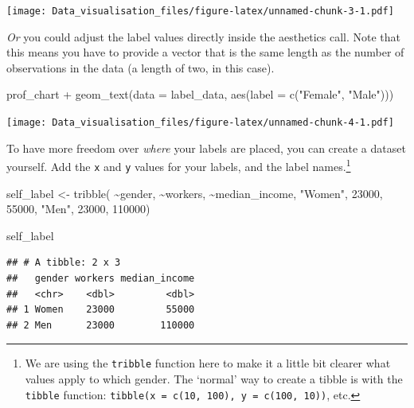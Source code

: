 \documentclass[
]{book}
\newenvironment{Shaded}{\begin{snugshade}}{\end{snugshade}}
\newcommand{\AttributeTok}[1]{\textcolor[rgb]{0.77,0.63,0.00}{#1}}
\newcommand{\DecValTok}[1]{\textcolor[rgb]{0.00,0.00,0.81}{#1}}
\newcommand{\FunctionTok}[1]{\textcolor[rgb]{0.00,0.00,0.00}{#1}}
\newcommand{\NormalTok}[1]{#1}
\newcommand{\OtherTok}[1]{\textcolor[rgb]{0.56,0.35,0.01}{#1}}
\newcommand{\SpecialCharTok}[1]{\textcolor[rgb]{0.00,0.00,0.00}{#1}}
\newcommand{\StringTok}[1]{\textcolor[rgb]{0.31,0.60,0.02}{#1}}
\begin{document}
\texttt{[image: Data\_visualisation\_files/figure-latex/unnamed-chunk-3-1.pdf]}

\emph{Or} you could adjust the label values directly inside the aesthetics call. Note that this means you have to provide a vector that is the same length as the number of observations in the data (a length of two, in this case).

\begin{Shaded}
\begin{Highlighting}[]
\NormalTok{prof\_chart }\SpecialCharTok{+}
  \FunctionTok{geom\_text}\NormalTok{(}\AttributeTok{data =}\NormalTok{ label\_data,}
            \FunctionTok{aes}\NormalTok{(}\AttributeTok{label =} \FunctionTok{c}\NormalTok{(}\StringTok{"Female"}\NormalTok{, }\StringTok{"Male"}\NormalTok{)))}
\end{Highlighting}
\end{Shaded}

\texttt{[image: Data\_visualisation\_files/figure-latex/unnamed-chunk-4-1.pdf]}

To have more freedom over \emph{where} your labels are placed, you can create a dataset yourself. Add the \texttt{x} and \texttt{y} values for your labels, and the label names.\footnote{We are using the \texttt{tribble} function here to make it a little bit clearer what values apply to which gender. The `normal' way to create a tibble is with the \texttt{tibble} function: \texttt{tibble(x\ =\ c(10,\ 100),\ y\ =\ c(100,\ 10))}, etc.}

\begin{Shaded}
\begin{Highlighting}[]
\NormalTok{self\_label }\OtherTok{\textless{}{-}} \FunctionTok{tribble}\NormalTok{(}
  \SpecialCharTok{\textasciitilde{}}\NormalTok{gender, }\SpecialCharTok{\textasciitilde{}}\NormalTok{workers,   }\SpecialCharTok{\textasciitilde{}}\NormalTok{median\_income,}
  \StringTok{"Women"}\NormalTok{,    }\DecValTok{23000}\NormalTok{,            }\DecValTok{55000}\NormalTok{,}
  \StringTok{"Men"}\NormalTok{,      }\DecValTok{23000}\NormalTok{,           }\DecValTok{110000}\NormalTok{)}


\NormalTok{self\_label}
\end{Highlighting}
\end{Shaded}

\begin{verbatim}
## # A tibble: 2 x 3
##   gender workers median_income
##   <chr>    <dbl>         <dbl>
## 1 Women    23000         55000
## 2 Men      23000        110000
\end{verbatim}
\end{document}
